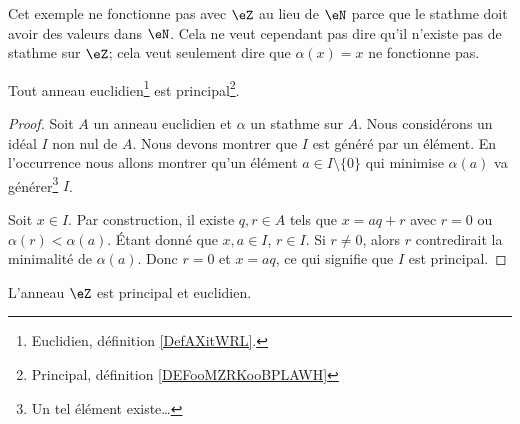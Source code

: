 Cet exemple ne fonctionne pas avec \( \eZ\) au lieu de \( \eN\) parce que le stathme doit avoir des valeurs dans \( \eN\). Cela ne veut cependant pas dire qu'il n'existe pas de stathme sur \( \eZ\); cela veut seulement dire que \( \alpha(x)=x\) ne fonctionne pas.

\begin{proposition}\label{Propkllxnv}
	Tout anneau euclidien\footnote{Euclidien, définition \ref{DefAXitWRL}.} est principal\footnote{Principal, définition \ref{DEFooMZRKooBPLAWH}}.
\end{proposition}

\begin{proof}
	Soit \( A\) un anneau euclidien et \( \alpha\) un stathme sur \( A\). Nous considérons un idéal \( I\) non nul de \( A\). Nous devons montrer que \( I\) est généré par un élément. En l'occurrence nous allons montrer qu'un élément \( a\in I\setminus\{ 0 \}\) qui minimise \( \alpha(a)\) va générer\footnote{Un tel élément existe\dots} \( I\).

	Soit \( x\in I\). Par construction, il existe \( q,r\in A\) tels que \( x=aq+r\) avec \( r=0\) ou \( \alpha(r)<\alpha(a)\). Étant donné que \( x,a\in I\), \( r\in I\). Si \( r\neq 0\), alors \( r\) contredirait la minimalité de \( \alpha(a)\). Donc \( r=0\) et \( x=aq\), ce qui signifie que \( I\) est principal.
\end{proof}

\begin{proposition}     \label{PROPooPJGLooQSrJTU}
	L'anneau \( \eZ\) est principal et euclidien.
\end{proposition}

